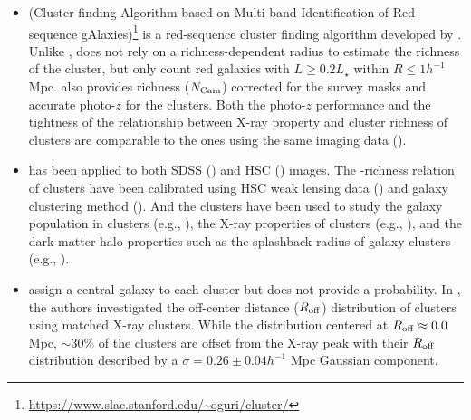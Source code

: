 \documentclass[fleqn,usenatbib,useAMS,english]{mnras}
\begin{document}
    \begin{itemize}

        \item \camira{} (Cluster finding Algorithm based on Multi-band Identification of
            Red-sequence gAlaxies)\footnote{\url{https://www.slac.stanford.edu/~oguri/cluster/}}
            is a red-sequence cluster finding algorithm developed by \citet{Oguri2014}.
            Unlike \redm{}, \camira{} does not rely on a richness-dependent radius to
            estimate the richness of the cluster, but only count red galaxies
            with $L \geq 0.2L_{\star}$ within $R \leq 1 h^{-1}$ Mpc.
            \camira{} also provides richness ($N_{\rm Cam}$) corrected for the survey masks
            and accurate photo-$z$ for the clusters.
            Both the photo-$z$ performance and the tightness of the relationship between
            X-ray property and cluster richness of \camira{} clusters are comparable to
            the \redm{} ones using the same imaging data (\citealt{Oguri2014}).

        \item \camira{} has been applied to both SDSS (\citealt{Oguri2014}) and HSC
            (\citealt{Oguri2018}) images.
            The \mvir{}-richness relation of \camira{} clusters have been calibrated using
            HSC weak lensing data (\citealt{Murata2019, Chiu2020a}) and galaxy
            clustering method (\citealt{Chiu2020b}).
            And the \camira{} clusters have been used to study the galaxy population in
            clusters (e.g., \addref{}), the X-ray properties of clusters (e.g., \addref{}),
            and the dark matter halo properties such as the splashback radius
            of galaxy clusters (e.g., \citealt{Murata2020}).

        \item \camira{} assign a central galaxy to each cluster but does not provide
            a probability.
            In \citet{Oguri2018}, the authors investigated the off-center distance ($R_{\rm
            off}$) distribution of \camira{} clusters using matched X-ray clusters.
            While the distribution centered at $R_{\rm off} \approx 0.0$ Mpc, $\sim 30$\%
            of the clusters are offset from the X-ray peak with their $R_{\rm off}$ distribution
            described by a $\sigma=0.26 \pm 0.04 h^{-1}$ Mpc Gaussian component.


\end{itemize}
\end{document}
